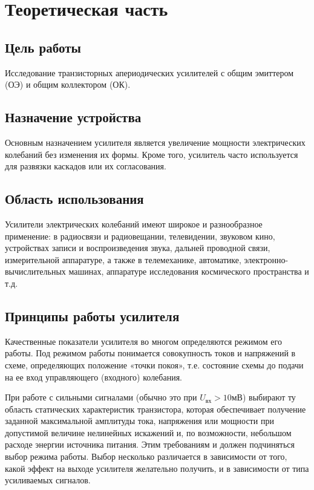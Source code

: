 
\usepackage{mathtools}


\def\labauthors{Сарафанов Ф.Г., Платонова М.В.}
\def\labgroup{430}
\def\labnumber{5}
\def\labtheme{Апериодический усилитель}
\renewcommand{\vec}{\mathbf}
\renewcommand{\Re}{\operatorname{Re}}
\renewcommand{\Im}{\operatorname{Im}}
\renewcommand{\phi}{\varphi}
\renewcommand{\hat}{\widehat}



\tableofcontents
\newpage

\section{Теоретическая часть}
\subsection{Цель работы}
Исследование транзисторных апериодических усилителей с общим эмиттером (ОЭ) и общим коллектором (ОК).

\subsection{Назначение устройства}
Основным назначением усилителя является увеличение мощности электрических колебаний без изменения их формы. Кроме того, усилитель часто используется для развязки каскадов или их согласования.

\subsection{Область использования}
Усилители электрических колебаний имеют широкое и разнообразное применение: в радиосвязи и радиовещании, телевидении, звуковом кино, устройствах записи и воспроизведения звука, дальней проводной связи, измерительной аппаратуре, а также в телемеханике, автоматике, электронно-вычислительных машинах, аппаратуре исследования космического пространства и т.д.

\subsection{Принципы работы усилителя}
Качественные показатели усилителя во многом определяются режимом его работы. Под режимом работы понимается совокупность токов и напряжений в схеме, определяющих положение «точки покоя», т.е. состояние схемы до подачи на ее вход управляющего (входного) колебания.

При работе с сильными сигналами (обычно это при $U_{\text{вх}}>10$мВ) выбирают ту область статических характеристик транзистора, которая обеспечивает получение заданной максимальной амплитуды тока, напряжения или мощности при допустимой величине
нелинейных искажений и, по возможности, небольшом расходе энергии источника питания. Этим требованиям и должен подчиняться выбор режима работы. Выбор несколько различается в зависимости от того, какой эффект на выходе усилителя желательно получить, и в зависимости от типа усиливаемых сигналов.

